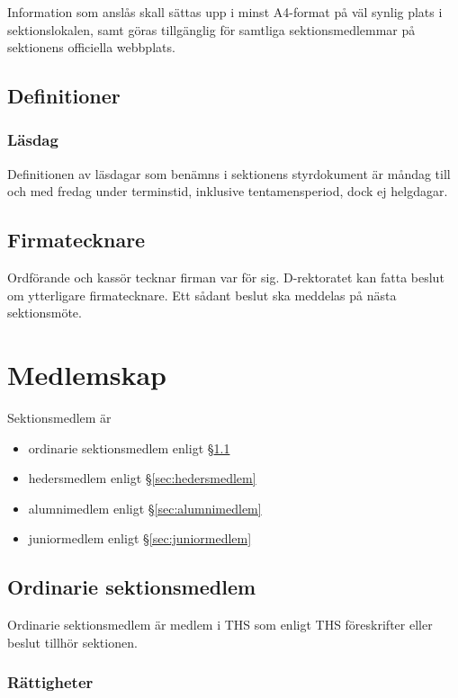 \documentclass{dgovdoc}
\begin{document}
Information som anslås skall sättas upp i minst A4-format på väl synlig plats i
sektionslokalen, samt göras tillgänglig för samtliga sektionsmedlemmar på
sektionens officiella webbplats.

\subsection{Definitioner}

\subsubsection{Läsdag}

Definitionen av läsdagar som benämns i sektionens styrdokument är
måndag till och med fredag under terminstid, inklusive tentamensperiod, dock ej helgdagar.

\subsection{Firmatecknare}

Ordförande och kassör tecknar firman var för sig. D-rektoratet kan fatta beslut
om ytterligare firmatecknare. Ett sådant beslut ska meddelas på nästa
sektionsmöte.

\section{Medlemskap}

Sektionsmedlem är

\begin{itemize}
  \item ordinarie sektionsmedlem enligt \S\ref{sec:ordinarie_sektionsmedlem}
  \item hedersmedlem enligt \S\ref{sec:hedersmedlem}
  \item alumnimedlem enligt \S\ref{sec:alumnimedlem}
  \item juniormedlem enligt \S\ref{sec:juniormedlem}
\end{itemize}

\subsection{Ordinarie sektionsmedlem}
\label{sec:ordinarie_sektionsmedlem}

Ordinarie sektionsmedlem är medlem i THS som enligt THS föreskrifter eller
beslut tillhör sektionen.

\subsubsection{Rättigheter}
\end{document}
